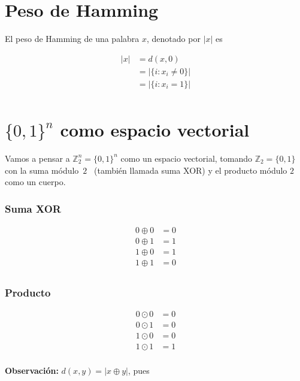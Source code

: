 \documentclass[10pt,a4paper]{article}
\begin{document}
\section*{Peso de Hamming}

El peso de Hamming de una palabra $x$, denotado por $\lvert x \rvert$ es

\begin{center}
\begin{align*}
\lvert x \rvert &= d(x, 0)\\
&= \lvert \{i : x_i  \neq 0\}\rvert\\
&= \lvert \{i : x_i  = 1\}\rvert\\
\end{align*}
\end{center}

\section*{$\{0, 1\}^n$ como espacio vectorial}

Vamos a pensar a $\mathbb{Z}_2^n = \{0, 1\}^n$ como un espacio vectorial, tomando $\mathbb{Z}_2 = \{0, 1\}$ con la suma módulo $2$  (también llamada suma XOR) y el producto módulo $2$ como un cuerpo.

\subsubsection*{Suma XOR}

\begin{align*}
0 \oplus 0 &= 0\\
0 \oplus 1 &= 1\\
1 \oplus 0 &= 1\\
1 \oplus 1 &= 0\\
\end{align*}

\subsubsection*{Producto}

\begin{align*}
0 \odot 0 &= 0\\
0 \odot 1 &= 0\\
1 \odot 0 &= 0\\
1 \odot 1 &= 1\\
\end{align*}

\textbf{Observación:} $d(x, y) = \lvert x \oplus y\rvert$, pues
\end{document}
